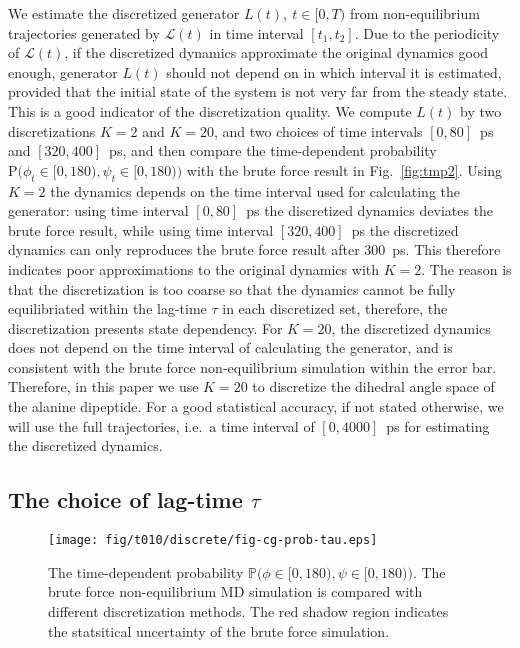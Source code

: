 \documentclass[aps, pre, preprint,unsortedaddress,a4paper,onecolumn]{revtex4}
\newcommand{\ml}[0]{\mathcal {L}}
\newcommand{\prob}{\textrm{P}}
\begin{document}
We estimate the discretized generator $L(t), \ t\in[0,T)$
from non-equilibrium trajectories generated by $\ml(t)$ in time interval $[t_1,
t_2]$.
Due to the periodicity of $\ml(t)$, if the discretized dynamics approximate the original
dynamics good enough, generator  $L(t)$ should not depend on in which interval
it is estimated, provided that the initial state of the system
is not very far from the steady state.
This is a good indicator of the discretization quality.
We compute $L(t)$ by two discretizations $K=2$ and $K=20$, and two
choices of time intervals $[0, 80]$~ps and $[320, 400]$~ps, and then
compare the time-dependent
probability $\prob\big(\phi_t\in[0,180), \psi_t\in [0,180)\big)$
with the brute force result in
Fig.~\ref{fig:tmp2}. 
Using $K=2$ the dynamics depends on the time interval used for
calculating the generator: using time interval $[0, 80]$~ps the discretized
dynamics deviates the brute force result,
while using time interval $[320, 400]$~ps the discretized dynamics can only
reproduces the brute force result after 300~ps.  This therefore indicates poor 
approximations to the original dynamics with $K=2$. The reason is that the
discretization is too coarse so that the dynamics cannot be fully
equilibriated within the lag-time $\tau$ in each discretized set,
therefore, the discretization presents state dependency.  For
$K=20$, the discretized dynamics does not depend on the time interval of
calculating the generator, and is consistent with the brute force
non-equilibrium simulation within the error bar. Therefore, in this paper we use $K=20$
to discretize  the dihedral angle space of the alanine dipeptide.
For a good statistical accuracy, if not stated otherwise,
we will use the full trajectories, i.e.~a time interval of
$[0,4000]$~ps for estimating the discretized dynamics.


\subsection{The choice of lag-time $\tau$}

\begin{figure}
  \centering
  \texttt{[image: fig/t010/discrete/fig-cg-prob-tau.eps]}  
  \caption{The time-dependent probability $\mathbb
    P\big(\phi\in[0,180), \psi\in [0,180)\big)$.  The brute force
    non-equilibrium MD simulation is compared with different
    discretization methods. The red shadow region indicates the
    statsitical uncertainty of the brute force simulation.}
  \label{fig:tmp3}
\end{figure}
\end{document}
